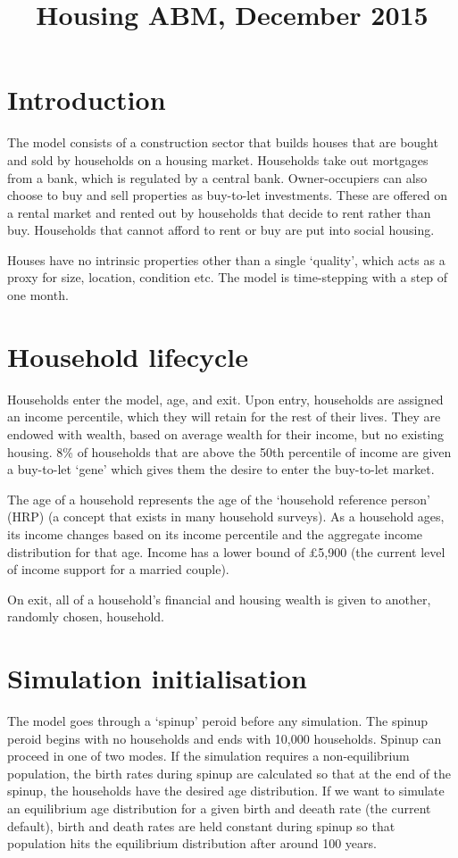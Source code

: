 \documentclass{article}
\begin{document}
\title{Housing ABM, December 2015}
\maketitle

\section{Introduction}
The model consists of a construction sector that builds houses that are bought and sold by households on a housing market. Households take out mortgages from a bank, which is regulated by a central bank. Owner-occupiers can also choose to buy and sell properties as buy-to-let investments. These are offered on a rental market and rented out by households that decide to rent rather than buy. Households that cannot afford to rent or buy are put into social housing.

Houses have no intrinsic properties other than a single `quality', which acts as a proxy for size, location, condition etc. The model is time-stepping with a step of one month.

\section{Household lifecycle}

Households enter the model, age, and exit. Upon entry, households are assigned an income percentile, which they will retain for the rest of their lives. They are endowed with wealth, based on average wealth for their income, but no existing housing. 8\% of households that are above the 50th percentile of income are given a buy-to-let `gene' which gives them the desire to enter the buy-to-let market.

The age of a household represents the age of the `household reference person' (HRP) (a concept that exists in many household surveys). As a household ages, its income changes based on its income percentile and the aggregate income distribution for that age. Income has a lower bound of \pounds 5,900 (the current level of income support for a married couple).

On exit, all of a household's financial and housing wealth is given to another, randomly chosen, household.
 
\section{Simulation initialisation}
The model goes through a `spinup' peroid before any simulation. The spinup peroid begins with no households and ends with 10,000 households. Spinup can proceed in one of two modes. If the simulation requires a non-equilibrium population, the birth rates during spinup are calculated so that at the end of the spinup, the households have the desired age distribution. If we want to simulate an equilibrium age distribution for a given birth and deeath rate (the current default), birth and death rates are held constant during spinup so that population hits the equilibrium distribution after around 100 years.
\end{document}
